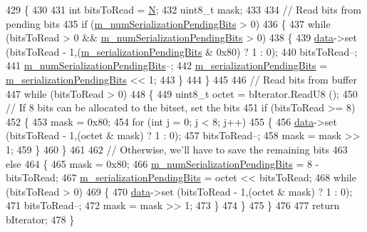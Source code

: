 \begin{DoxyCode}
429 \{
430 
431   \textcolor{keywordtype}{int} bitsToRead = \hyperlink{loss__ITU1238_8m_aaa6c78b1d659f53598dbe891c1139b3e}{N};
432   uint8\_t mask;
433 
434   \textcolor{comment}{// Read bits from pending bits}
435   \textcolor{keywordflow}{if} (\hyperlink{classns3_1_1Asn1Header_a663fc3287a1e7e4c383575e432480e6c}{m\_numSerializationPendingBits} > 0)
436     \{
437       \textcolor{keywordflow}{while} (bitsToRead > 0 && \hyperlink{classns3_1_1Asn1Header_a663fc3287a1e7e4c383575e432480e6c}{m\_numSerializationPendingBits} > 0)
438         \{
439           \hyperlink{topology-example-sim_8cc_a26c65296e316af77b787dc77469bb2a4}{data}->set (bitsToRead - 1,(\hyperlink{classns3_1_1Asn1Header_ad48f6854caeba65c2631675cf416a2c9}{m\_serializationPendingBits} & 0x80) ? 1 :
       0);
440           bitsToRead--;
441           \hyperlink{classns3_1_1Asn1Header_a663fc3287a1e7e4c383575e432480e6c}{m\_numSerializationPendingBits}--;
442           \hyperlink{classns3_1_1Asn1Header_ad48f6854caeba65c2631675cf416a2c9}{m\_serializationPendingBits} = 
      \hyperlink{classns3_1_1Asn1Header_ad48f6854caeba65c2631675cf416a2c9}{m\_serializationPendingBits} << 1;
443         \}
444     \}
445 
446   \textcolor{comment}{// Read bits from buffer}
447   \textcolor{keywordflow}{while} (bitsToRead > 0)
448     \{
449       uint8\_t octet = bIterator.ReadU8 ();
450       \textcolor{comment}{// If 8 bits can be allocated to the bitset, set the bits}
451       \textcolor{keywordflow}{if} (bitsToRead >= 8)
452         \{
453           mask = 0x80;
454           \textcolor{keywordflow}{for} (\textcolor{keywordtype}{int} j = 0; j < 8; j++)
455             \{
456               \hyperlink{topology-example-sim_8cc_a26c65296e316af77b787dc77469bb2a4}{data}->set (bitsToRead - 1,(octet & mask) ? 1 : 0);
457               bitsToRead--;
458               mask = mask >> 1;
459             \}
460         \}
461 
462       \textcolor{comment}{// Otherwise, we'll have to save the remaining bits}
463       \textcolor{keywordflow}{else}
464         \{
465           mask = 0x80;
466           \hyperlink{classns3_1_1Asn1Header_a663fc3287a1e7e4c383575e432480e6c}{m\_numSerializationPendingBits} = 8 - bitsToRead;
467           \hyperlink{classns3_1_1Asn1Header_ad48f6854caeba65c2631675cf416a2c9}{m\_serializationPendingBits} = octet << bitsToRead;
468           \textcolor{keywordflow}{while} (bitsToRead > 0)
469             \{
470               \hyperlink{topology-example-sim_8cc_a26c65296e316af77b787dc77469bb2a4}{data}->set (bitsToRead - 1,(octet & mask) ? 1 : 0);
471               bitsToRead--;
472               mask = mask >> 1;
473             \}
474         \}
475     \}
476 
477   \textcolor{keywordflow}{return} bIterator;
478 \}
\end{DoxyCode}


